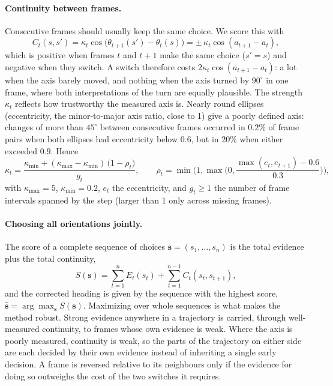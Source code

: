 \paragraph{Continuity between frames.}
Consecutive frames should usually keep the same choice. We score this with
\begin{equation}
  C_t(s, s') = \kappa_t \cos\!\big(\theta_{t+1}(s') - \theta_t(s)\big)
             = \pm\, \kappa_t \cos(a_{t+1} - a_t),
\end{equation}
which is positive when frames $t$ and $t+1$ make the same choice ($s' = s$) and negative when they switch. A switch
therefore costs $2\kappa_t\cos(a_{t+1} - a_t)$: a lot when the axis barely moved, and nothing when the axis turned by
$90^\circ$ in one frame, where both interpretations of the turn are equally plausible. The strength $\kappa_t$
reflects how trustworthy the measured axis is. Nearly round ellipses (eccentricity, the minor-to-major axis ratio,
close to 1) give a poorly defined axis: changes of more than $45^\circ$ between consecutive frames occurred in
$0.2\%$ of frame pairs when both ellipses had eccentricity below $0.6$, but in $20\%$ when either exceeded $0.9$.
Hence
\begin{equation}
  \kappa_t = \frac{\kappa_{\min} + (\kappa_{\max} - \kappa_{\min})\,\big(1 - \rho_t\big)}{g_t}, \qquad
  \rho_t = \min\!\Big(1, \max\!\Big(0, \frac{\max(e_t, e_{t+1}) - 0.6}{0.3}\Big)\Big),
\end{equation}
with $\kappa_{\max} = 5$, $\kappa_{\min} = 0.2$, $e_t$ the eccentricity, and $g_t \ge 1$ the number of frame intervals
spanned by the step (larger than 1 only across missing frames).

\paragraph{Choosing all orientations jointly.}
The score of a complete sequence of choices $\mathbf{s} = (s_1, \dots, s_n)$ is the total evidence plus the total
continuity,
\begin{equation}
  S(\mathbf{s}) = \sum_{t=1}^{n} E_t(s_t) + \sum_{t=1}^{n-1} C_t(s_t, s_{t+1}),
\end{equation}
and the corrected heading is given by the sequence with the highest score, $\hat{\mathbf{s}} = \arg\max_{\mathbf{s}}
S(\mathbf{s})$. Maximizing over whole sequences is what makes the method robust. Strong evidence anywhere in a
trajectory is carried, through well-measured continuity, to frames whose own evidence is weak. Where the axis is
poorly measured, continuity is weak, so the parts of the trajectory on either side are each decided by their own
evidence instead of inheriting a single early decision. A frame is reversed relative to its neighbours only if
the evidence for doing so outweighs the cost of the two switches it requires.

